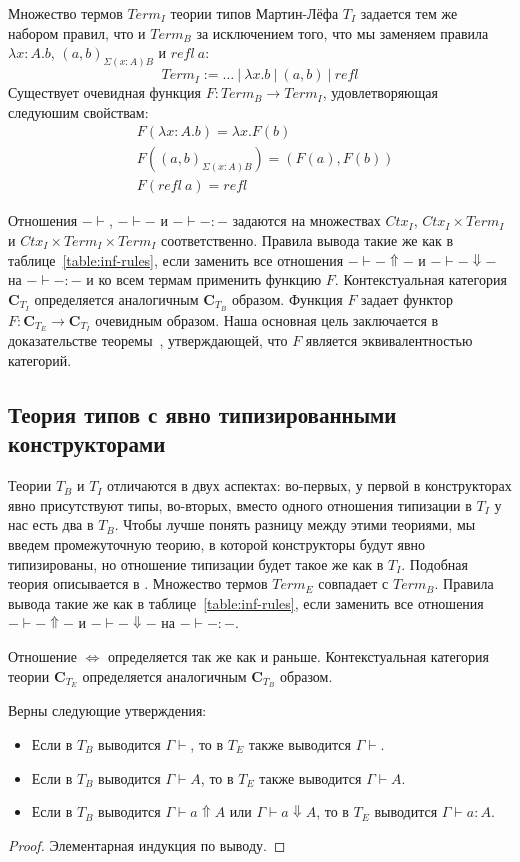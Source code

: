 \documentclass{amsart}
\theoremstyle{definition}
\theoremstyle{remark}
\newcommand{\deq}{\Leftrightarrow}
\newcommand{\cat}[1]{\mathbf{#1}}
\renewcommand{\C}{\cat{C}}
\numberwithin{figure}{section}
\begin{document}
Множество термов $Term_I$ теории типов Мартин-Лёфа $T_I$ задается тем же набором правил, что и $Term_B$ за исключением того, что мы заменяем правила $\lambda x : A. b$, $(a, b)_{\Sigma (x : A) B}$ и $refl\ a$:
\[ Term_I := \ldots\ |\ \lambda x. b\ |\ (a, b)\ |\ refl \]
Существует очевидная функция $F : Term_B \to Term_I$, удовлетворяющая следуюшим свойствам:
\begin{align*}
& F(\lambda x : A. b) = \lambda x. F(b) \\
& F((a, b)_{\Sigma (x : A) B}) = (F(a), F(b)) \\
& F(refl\ a) = refl
\end{align*}

Отношения $- \vdash$, $- \vdash -$ и $- \vdash - : -$ задаются на множествах $Ctx_I$, $Ctx_I \times Term_I$ и $Ctx_I \times Term_I \times Term_I$ соответственно.
Правила вывода такие же как в таблице~\ref{table:inf-rules}, если заменить все отношения $- \vdash - \Uparrow -$ и $- \vdash - \Downarrow -$ на $- \vdash - : -$ и ко всем термам применить функцию $F$.
Контекстуальная категория $\C_{T_I}$ определяется аналогичным $\C_{T_B}$ образом.
Функция $F$ задает функтор $F : \C_{T_E} \to \C_{T_I}$ очевидным образом.
Наша основная цель заключается в доказательстве теоремы~, утверждающей, что $F$ является эквивалентностью категорий.

\subsection{Теория типов с явно типизированными конструкторами}

Теории $T_B$ и $T_I$ отличаются в двух аспектах: во-первых, у первой в конструкторах явно присутствуют типы, во-вторых, вместо одного отношения типизации в $T_I$ у нас есть два в $T_B$.
Чтобы лучше понять разницу между этими теориями, мы введем промежуточную теорию, в которой конструкторы будут явно типизированы, но отношение типизации будет такое же как в $T_I$.
Подобная теория описывается в \cite{luo94}.
Множество термов $Term_E$ совпадает с $Term_B$.
Правила вывода такие же как в таблице~\ref{table:inf-rules}, если заменить все отношения $- \vdash - \Uparrow -$ и $- \vdash - \Downarrow -$ на $- \vdash - : -$.

Отношение $\deq$ определяется так же как и раньше.
Контекстуальная категория теории $\C_{T_E}$ определяется аналогичным $\C_{T_B}$ образом.

\begin{prop}
Верны следующие утверждения:
\begin{itemize}
\item Если в $T_B$ выводится $\Gamma \vdash$, то в $T_E$ также выводится $\Gamma \vdash$.
\item Если в $T_B$ выводится $\Gamma \vdash A$, то в $T_E$ также выводится $\Gamma \vdash A$.
\item Если в $T_B$ выводится $\Gamma \vdash a \Uparrow A$ или $\Gamma \vdash a \Downarrow A$, то в $T_E$ выводится $\Gamma \vdash a : A$.
\end{itemize}
\end{prop}
\begin{proof}
Элементарная индукция по выводу.
\end{proof}
\end{document}

